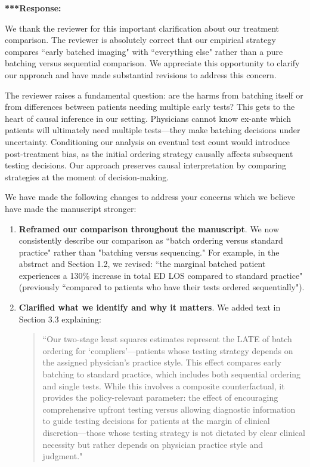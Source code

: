 \documentclass[11pt]{article}
\newcommand{\1}{\hbox{\rm 1\kern-.35em 1}}
\begin{document}
{{\noindent\textbf{***Response:} \color{blue}

We thank the reviewer for this important clarification about our treatment comparison. The reviewer is absolutely correct that our empirical strategy compares ``early batched imaging" with ``everything else" rather than a pure batching versus sequential comparison. We appreciate this opportunity to clarify our approach and have made substantial revisions to address this concern.

The reviewer raises a fundamental question: are the harms from batching itself or from differences between patients needing multiple early tests? This gets to the heart of causal inference in our setting. Physicians cannot know ex-ante which patients will ultimately need multiple tests—they make batching decisions under uncertainty. Conditioning our analysis on eventual test count would introduce post-treatment bias, as the initial ordering strategy causally affects subsequent testing decisions. Our approach preserves causal interpretation by comparing strategies at the moment of decision-making.

We have made the following changes to address your concerns which we believe have made the manuscript stronger:

\begin{enumerate}
    \item \textbf{Reframed our comparison throughout the manuscript}. We now consistently describe our comparison as ``batch ordering versus standard practice" rather than "batching versus sequencing." For example, in the abstract and Section 1.2, we revised: ``the marginal batched patient experiences a 130\% increase in total ED LOS compared to standard practice" (previously ``compared to patients who have their tests ordered sequentially").

    \item \textbf{Clarified what we identify and why it matters}. We added text in Section 3.3 explaining: 
    \begin{quote}
    ``Our two-stage least squares estimates represent the LATE of batch ordering for `compliers'---patients whose testing strategy depends on the assigned physician's practice style. This effect compares early batching to standard practice, which includes both sequential ordering and single tests. While this involves a composite counterfactual, it provides the policy-relevant parameter: the effect of encouraging comprehensive upfront testing versus allowing diagnostic information to guide testing decisions for patients at the margin of clinical discretion—those whose testing strategy is not dictated by clear clinical necessity but rather depends on physician practice style and judgment."
    \end{quote}


\end{enumerate}}}
\end{document}
